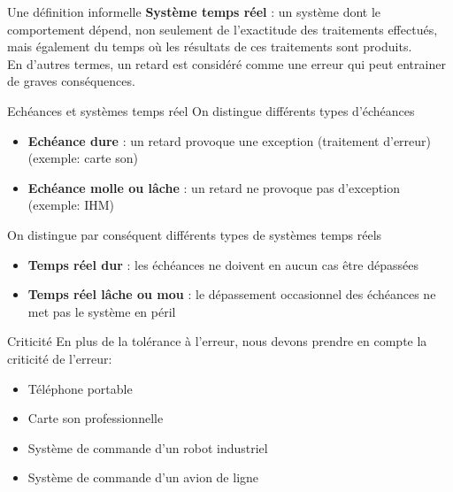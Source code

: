 \begin{frame}{Une définition informelle}
  \textbf{Système  temps réel  }  : un  système  dont le  comportement
  dépend,  non seulement  de l'exactitude  des  traitements effectués,
  mais également
  du temps où les résultats de ces traitements sont produits.\\[3mm]

  En d'autres  termes, un  retard est considéré  comme une  erreur qui
  peut entrainer de graves  conséquences.  

\end{frame}

\begin{frame}{Echéances et systèmes temps réel}
  On distingue différents types d'échéances
  \begin{itemize}
  \item  \textbf{Echéance dure}  :  un retard  provoque une  exception
    (traitement d'erreur) (exemple:  carte son)
  \item \textbf{Echéance molle  ou lâche} : un retard  ne provoque pas
    d'exception (exemple: IHM)
  \end{itemize}

  On distingue par conséquent différents types de systèmes temps réels
  \begin{itemize}
  \item \textbf{Temps  réel dur} :  les échéances ne doivent  en aucun
    cas  être  dépassées 
  \item \textbf{Temps réel lâche  ou mou} : le dépassement occasionnel
    des échéances ne met pas  le système en péril
  \end{itemize}
\end{frame}

\begin{frame}{Criticité}
  En plus de la tolérance à l'erreur, nous devons prendre en compte la
  criticité de l'erreur:
  \begin{itemize} 
  \item Téléphone portable
  \item Carte son professionnelle
  \item Système de commande d'un robot industriel
  \item Système de commande d'un avion de ligne
  \end{itemize} 
\end{frame}

